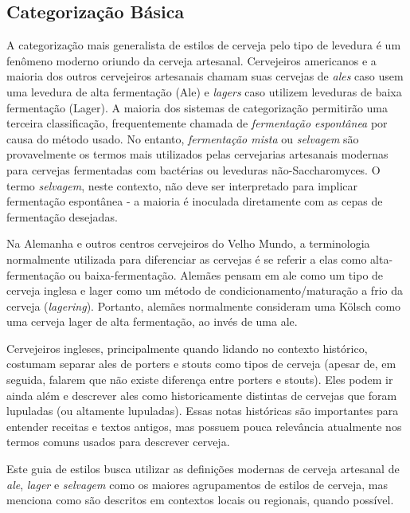\subsection*{Categorização Básica}
A categorização mais generalista de estilos de cerveja pelo tipo de levedura é um fenômeno moderno oriundo da cerveja artesanal. Cervejeiros americanos e a maioria dos outros cervejeiros artesanais chamam suas cervejas de \textit{ales} caso usem uma levedura de alta fermentação (Ale) e \textit{lagers} caso utilizem leveduras de baixa fermentação (Lager). A maioria dos sistemas de categorização permitirão uma terceira classificação, frequentemente chamada de \textit{fermentação espontânea} por causa do método usado. No entanto, \textit{fermentação mista} ou \textit{selvagem} são provavelmente os termos mais utilizados pelas cervejarias artesanais modernas para cervejas fermentadas com bactérias ou leveduras não-Saccharomyces. O termo \textit{selvagem}, neste contexto, não deve ser interpretado para implicar fermentação espontânea - a maioria é inoculada diretamente com as cepas de fermentação desejadas.

Na Alemanha e outros centros cervejeiros do Velho Mundo, a terminologia normalmente utilizada para diferenciar as cervejas é se referir a elas como alta-fermentação ou baixa-fermentação. Alemães pensam em ale como um tipo de cerveja inglesa e lager como um método de condicionamento/maturação a frio da cerveja (\textit{lagering}). Portanto, alemães normalmente consideram uma Kölsch como uma cerveja lager de alta fermentação, ao invés de uma ale.

Cervejeiros ingleses, principalmente quando lidando no contexto histórico, costumam separar ales de porters e stouts como tipos de cerveja (apesar de, em seguida, falarem que não existe diferença entre porters e stouts). Eles podem ir ainda além e descrever ales como historicamente distintas de cervejas que foram lupuladas (ou altamente lupuladas). Essas notas históricas são importantes para entender receitas e textos antigos, mas possuem pouca relevância atualmente nos termos comuns usados para descrever cerveja.

Este guia de estilos busca utilizar as definições modernas de cerveja artesanal de \textit{ale}, \textit{lager} e \textit{selvagem} como os maiores agrupamentos de estilos de cerveja, mas menciona como são descritos em contextos locais ou regionais, quando possível.
